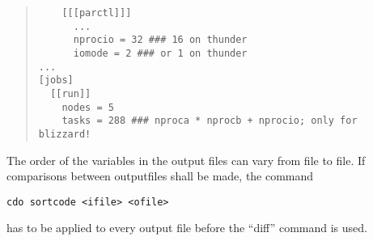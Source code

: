 \begin{quote}
\begin{verbatim}
    [[[parctl]]]
      ...
      nprocio = 32 ### 16 on thunder
      iomode = 2 ### or 1 on thunder
...
[jobs]
  [[run]]
    nodes = 5
    tasks = 288 ### nproca * nprocb + nprocio; only for blizzard!
\end{verbatim}
\end{quote}

The order of the variables in the output files can vary from file to file. If
comparisons between outputfiles shall be made, the command
\begin{lstlisting}
cdo sortcode <ifile> <ofile>
\end{lstlisting}
has to be applied to every output file before the ``diff'' command is
used.
